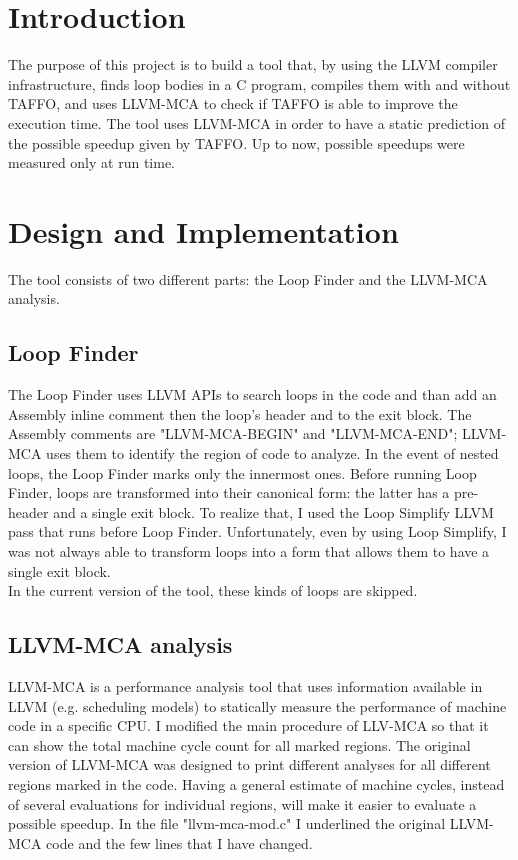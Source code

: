 \section{Introduction}

The purpose of this project is to build a tool that, by using the LLVM compiler infrastructure, finds loop bodies in a C program, compiles them with and without TAFFO, and uses LLVM-MCA to check if TAFFO is able to improve the execution time.
The tool uses LLVM-MCA in order to have a static prediction of the possible speedup given by TAFFO. Up to now, possible speedups were measured only at run time.

\section{Design and Implementation}
The tool consists of two different parts: the Loop Finder and the LLVM-MCA analysis.

\subsection{Loop Finder}
The Loop Finder uses LLVM APIs to search loops in the code and than add an Assembly inline comment then the loop's header and to the exit block.
The Assembly comments are "LLVM-MCA-BEGIN" and "LLVM-MCA-END"; 
 LLVM-MCA uses them to identify the region of code to analyze.
In the event of nested loops, the Loop Finder marks only the innermost ones.
Before running Loop Finder, loops are transformed into their canonical form: the latter has a pre-header and a single exit block. To realize that, I used the Loop Simplify LLVM pass that runs before Loop Finder.
Unfortunately, even by using Loop Simplify, I was not always able to transform loops into a form that allows them to have a single exit block.\\
In the current version of the tool, these kinds of loops are skipped.

\subsection{LLVM-MCA analysis}

LLVM-MCA is a performance analysis tool that uses information available in LLVM (e.g. scheduling models) to statically measure the performance of machine code in a specific CPU.
I modified the main procedure of LLV-MCA so that it can show the total machine cycle count for all marked regions. The original version of LLVM-MCA was designed to print different analyses for all different regions marked in the code.
Having a general estimate of machine cycles, instead of several evaluations for individual regions, will make it easier to evaluate a possible speedup.
In the file "llvm-mca-mod.c" I underlined the original LLVM-MCA code and the few lines that I have changed.


